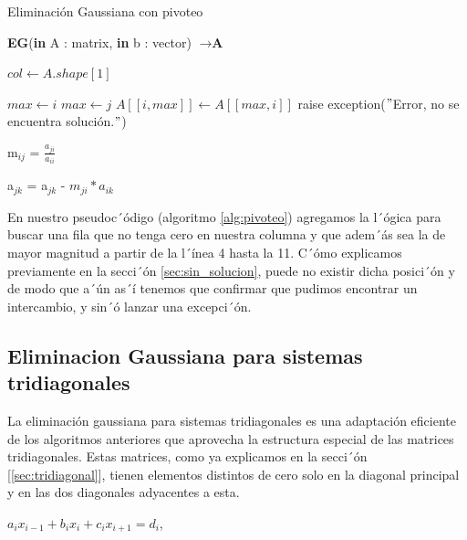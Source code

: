 \begin{algorithm}
\caption{Eliminación Gaussiana con pivoteo}\label{alg:pivoteo}
\begin{algorithmic}[1]
\State \textbf{EG}(\textbf{in} A : matrix, \textbf{in} b : vector) $\to \textbf{A}$
 
 \State $col \gets A.shape[1]$
 
        \State $max \gets i$
                \State $max \gets j$
            \EndIf
        \EndFor
        \State $A[[i,max]] \gets A[[max,i]]$
    \EndIf
        \State  raise exception($"$Error, no se encuentra solución.$"$) 
    \EndIf
\EndFor
{}

    \State m$_{ij}$ = $\frac{a_{ji}}{a_{ii}}$
    
        \State a$_{jk}$ = a$_{jk}$ - $m_{ji}*{a_{ik}}$
    \EndFor

\EndFor
\end{algorithmic}
\end{algorithm}

En nuestro pseudoc´ódigo (algoritmo \ref{alg:pivoteo}) agregamos la l´ógica para buscar una fila que no tenga cero en nuestra columna y que adem´ás sea la de mayor magnitud a partir de la l´ínea 4 hasta la 11. C´ómo explicamos previamente en la secci´ón \ref{sec:sin_solucion}, puede no existir dicha posici´ón y de modo que a´ún as´í tenemos que confirmar que pudimos encontrar un intercambio, y sin´ó lanzar una excepci´ón.

\subsection{Eliminacion Gaussiana para sistemas tridiagonales}
\label{tridiagonal}
La eliminación gaussiana para sistemas tridiagonales es una adaptación eficiente de los algoritmos anteriores que aprovecha la estructura especial de las matrices tridiagonales. Estas matrices, como ya explicamos en la secci´ón [\ref{sec:tridiagonal}], tienen elementos distintos de cero solo en la diagonal principal y en las dos diagonales adyacentes a esta.
\begin{center}
    $a_{i}x_{i-1}+b_{i}x_{i}+c_{i}x_{i+1} = d_{i}$,
\end{center}
    
    

